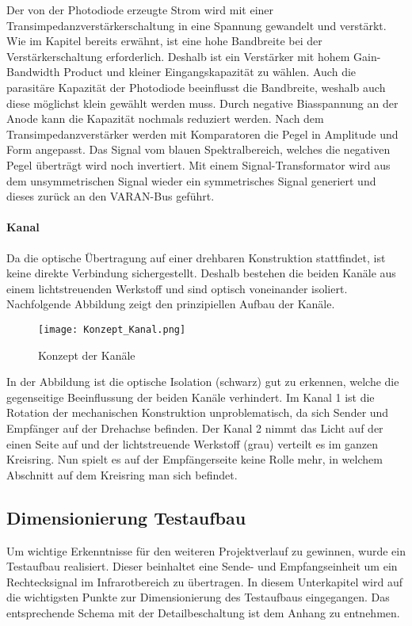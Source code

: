 Der von der Photodiode erzeugte Strom wird mit einer Transimpedanzverstärkerschaltung in eine Spannung gewandelt und verstärkt. Wie im Kapitel  bereits erwähnt, ist eine hohe Bandbreite bei der Verstärkerschaltung erforderlich. Deshalb ist ein Verstärker mit hohem Gain-Bandwidth Product und kleiner Eingangskapazität zu wählen. Auch die parasitäre Kapazität der Photodiode beeinflusst die Bandbreite, weshalb auch diese möglichst klein gewählt werden muss. Durch negative Biasspannung an der Anode kann die Kapazität nochmals reduziert werden.
\newline
Nach dem Transimpedanzverstärker werden mit Komparatoren die Pegel in Amplitude und Form angepasst. Das Signal vom blauen Spektralbereich, welches die negativen Pegel überträgt wird noch invertiert. Mit einem Signal-Transformator wird aus dem unsymmetrischen Signal wieder ein symmetrisches Signal generiert und dieses zurück an den VARAN-Bus geführt.

\paragraph{Kanal}
Da die optische Übertragung auf einer drehbaren Konstruktion stattfindet, ist keine direkte Verbindung sichergestellt. Deshalb bestehen die beiden Kanäle aus einem lichtstreuenden Werkstoff und sind optisch voneinander isoliert. Nachfolgende Abbildung zeigt den prinzipiellen Aufbau der Kanäle.

\begin{figure}[h]
	\centering
	\texttt{[image: Konzept\_Kanal.png]}
	\caption{Konzept der Kanäle}\label{fig:Konzept_Kanal}
\end{figure}

In der Abbildung ist die optische Isolation (schwarz) gut zu erkennen, welche die gegenseitige Beeinflussung der beiden Kanäle verhindert. Im Kanal 1 ist die Rotation der mechanischen Konstruktion unproblematisch, da sich Sender und Empfänger auf der Drehachse befinden. Der Kanal 2 nimmt das Licht auf der einen Seite auf und der lichtstreuende Werkstoff (grau) verteilt es im ganzen Kreisring. Nun spielt es auf der Empfängerseite keine Rolle mehr, in welchem Abschnitt auf dem Kreisring man sich befindet.

\subsection{Dimensionierung Testaufbau}
Um wichtige Erkenntnisse für den weiteren Projektverlauf zu gewinnen, wurde ein Testaufbau realisiert. Dieser beinhaltet eine Sende- und Empfangseinheit um ein Rechtecksignal im Infrarotbereich zu übertragen. 
In diesem Unterkapitel wird auf die wichtigsten Punkte zur Dimensionierung des Testaufbaus eingegangen. Das entsprechende Schema mit der Detailbeschaltung ist dem Anhang zu entnehmen.
